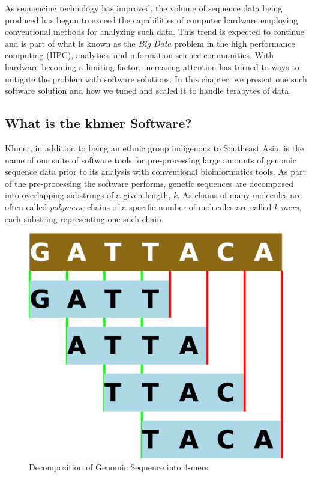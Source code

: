 \documentclass{article}
\begin{document}
As sequencing technology has improved, the volume of sequence data being produced has begun to exceed the capabilities of computer hardware employing conventional methods for analyzing such data. This trend is expected to continue and is part of what is known as the \textit{Big Data} \citep{web:bigdata} problem in the high performance computing (HPC), analytics, and information science communities. With hardware becoming a limiting factor, increasing attention has turned to ways to mitigate the problem with software solutions. In this chapter, we present one such software solution and how we tuned and scaled it to handle terabytes of data.

\subsection{What is the khmer Software?}

Khmer, in addition to being an ethnic group indigenous to Southeast Asia, is the name of our suite of software tools \citep{web:khmer} for pre-processing large amounts of genomic sequence data prior to its analysis with conventional bioinformatics tools. As part of the pre-processing the software performs, genetic sequences are decomposed into overlapping substrings of a given length, \textit{k}. As chains of many molecules are often called \textit{polymers}, chains of a specific number of molecules are called \textit{k-mers}, each substring representing one such chain. 

\begin{figure}[ht!]
\centering
\includegraphics[scale=0.5]{kmers.eps}
\caption{Decomposition of Genomic Sequence into 4-mers}
\label{kmers}
\end{figure}
\end{document}
